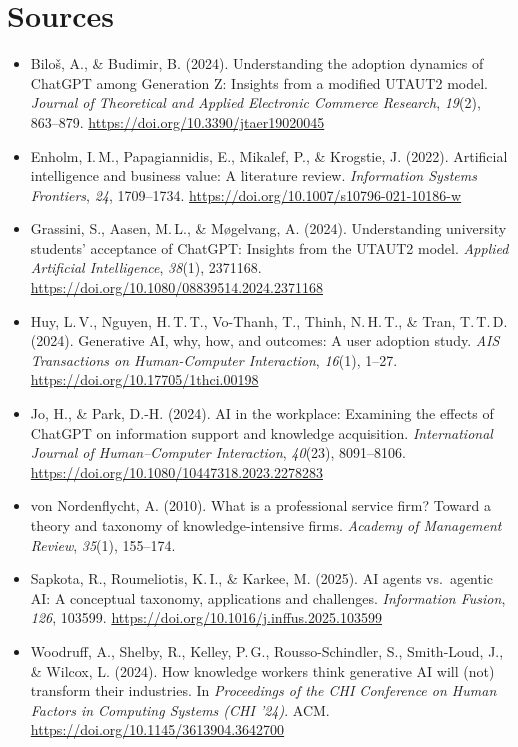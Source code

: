 \documentclass[11pt,a4paper,british,twoside=false,headings=small,chapterprefix=false,numbers=noenddot]{scrbook}
\begin{document}
\section*{Sources}
\begin{itemize}\small
  \item Bilo\v{s}, A., \& Budimir, B. (2024). Understanding the adoption dynamics of ChatGPT among Generation Z: Insights from a modified UTAUT2 model. \emph{Journal of Theoretical and Applied Electronic Commerce Research}, \emph{19}(2), 863--879. \url{https://doi.org/10.3390/jtaer19020045}
  \item Enholm, I.\,M., Papagiannidis, E., Mikalef, P., \& Krogstie, J. (2022). Artificial intelligence and business value: A literature review. \emph{Information Systems Frontiers}, \emph{24}, 1709--1734. \url{https://doi.org/10.1007/s10796-021-10186-w}
  \item Grassini, S., Aasen, M.\,L., \& M\o gelvang, A. (2024). Understanding university students' acceptance of ChatGPT: Insights from the UTAUT2 model. \emph{Applied Artificial Intelligence}, \emph{38}(1), 2371168. \url{https://doi.org/10.1080/08839514.2024.2371168}
  \item Huy, L.\,V., Nguyen, H.\,T.\,T., Vo-Thanh, T., Thinh, N.\,H.\,T., \& Tran, T.\,T.\,D. (2024). Generative AI, why, how, and outcomes: A user adoption study. \emph{AIS Transactions on Human-Computer Interaction}, \emph{16}(1), 1--27. \url{https://doi.org/10.17705/1thci.00198}
  \item Jo, H., \& Park, D.-H. (2024). AI in the workplace: Examining the effects of ChatGPT on information support and knowledge acquisition. \emph{International Journal of Human--Computer Interaction}, \emph{40}(23), 8091--8106. \url{https://doi.org/10.1080/10447318.2023.2278283}
  \item von Nordenflycht, A. (2010). What is a professional service firm? Toward a theory and taxonomy of knowledge-intensive firms. \emph{Academy of Management Review}, \emph{35}(1), 155--174.
  \item Sapkota, R., Roumeliotis, K.\,I., \& Karkee, M. (2025). AI agents vs.\ agentic AI: A conceptual taxonomy, applications and challenges. \emph{Information Fusion}, \emph{126}, 103599. \url{https://doi.org/10.1016/j.inffus.2025.103599}
  \item Woodruff, A., Shelby, R., Kelley, P.\,G., Rousso-Schindler, S., Smith-Loud, J., \& Wilcox, L. (2024). How knowledge workers think generative AI will (not) transform their industries. In \emph{Proceedings of the CHI Conference on Human Factors in Computing Systems (CHI '24)}. ACM. \url{https://doi.org/10.1145/3613904.3642700}

\end{itemize}
\end{document}

